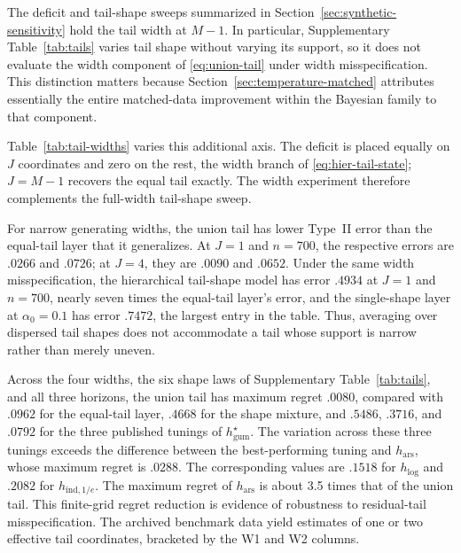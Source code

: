 \documentclass[11pt]{article}
\begin{document}
The deficit and tail-shape sweeps summarized in
Section~\ref{sec:synthetic-sensitivity} hold the tail width at $M-1$.
In particular, Supplementary Table~\ref{tab:tails} varies tail shape without
varying its support, so it does not evaluate the width component of
\eqref{eq:union-tail} under width misspecification.  This distinction matters
because Section~\ref{sec:temperature-matched} attributes essentially the entire
matched-data improvement within the Bayesian family to that component.

Table~\ref{tab:tail-widths} varies this additional axis.  The deficit is placed
equally on $J$ coordinates and zero on the rest, the width branch of
\eqref{eq:hier-tail-state}; $J=M-1$ recovers the equal tail exactly.
The width experiment therefore complements the full-width tail-shape sweep.

For narrow generating widths, the union tail has lower Type~II error than the
equal-tail layer that it generalizes.  At $J=1$ and $n=700$, the respective
errors are $.0266$ and $.0726$; at $J=4$, they are $.0090$ and $.0652$.  Under
the same width misspecification, the hierarchical tail-shape model has error
$.4934$ at $J=1$ and $n=700$, nearly seven times the equal-tail layer's error,
and the single-shape layer at $\alpha_0=0.1$ has error $.7472$, the largest entry
in the table.  Thus, averaging over dispersed tail shapes does not accommodate a
tail whose support is narrow rather than merely uneven.

Across the four widths, the six shape laws of Supplementary Table~\ref{tab:tails}, and all
three horizons, the union tail has maximum regret $.0080$, compared with $.0962$
for the equal-tail layer, $.4668$ for the shape mixture, and $.5486$, $.3716$,
and $.0792$ for the three published tunings of $h^\star_{\mathrm{gum}}$.  The
variation across these three tunings exceeds the difference between the
best-performing tuning and $h_{\mathrm{ars}}$, whose maximum regret is $.0288$.
The corresponding values are $.1518$ for $h_{\log}$ and $.2082$ for
$h_{\mathrm{ind},1/e}$.  The maximum regret of $h_{\mathrm{ars}}$ is about 3.5
times that of the union tail.  This finite-grid regret reduction is evidence
of robustness to residual-tail misspecification.  The archived benchmark data
yield estimates of one or two effective tail coordinates, bracketed by the W1
and W2 columns.
\end{document}

